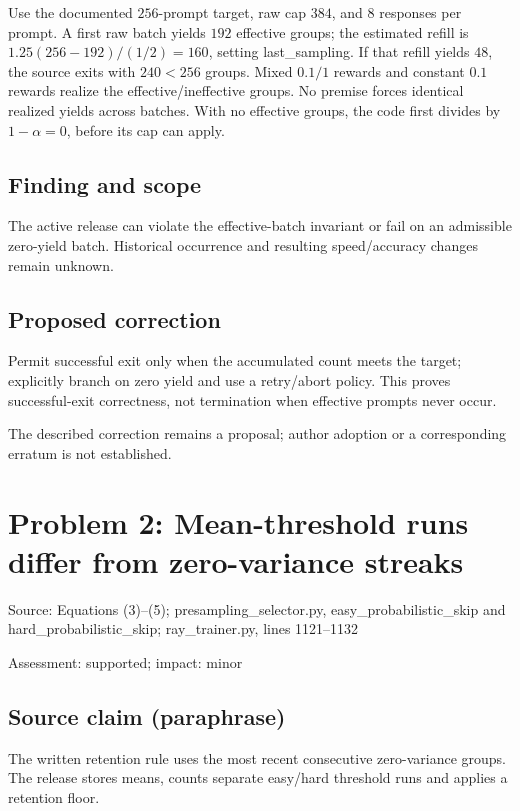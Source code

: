 \documentclass[11pt]{article}
\begin{document}
Use the documented \(256\)-prompt target, raw cap \(384\), and \(8\) responses per prompt. A first raw batch yields \(192\) effective groups; the estimated refill is \(1.25(256-192)/(1/2)=160\), setting last\_sampling. If that refill yields \(48\), the source exits with \(240<256\) groups. Mixed \(0.1/1\) rewards and constant \(0.1\) rewards realize the effective/ineffective groups. No premise forces identical realized yields across batches. With no effective groups, the code first divides by \(1-\alpha=0\), before its cap can apply.

\subsection*{Finding and scope}

The active release can violate the effective-batch invariant or fail on an admissible zero-yield batch. Historical occurrence and resulting speed/accuracy changes remain unknown.

\subsection*{Proposed correction}

Permit successful exit only when the accumulated count meets the target; explicitly branch on zero yield and use a retry/abort policy. This proves successful-exit correctness, not termination when effective prompts never occur.

The described correction remains a proposal; author adoption or a corresponding erratum is not established.

\section*{Problem 2: Mean-threshold runs differ from zero-variance streaks}

Source: Equations (3)–(5); presampling\_selector.py, easy\_probabilistic\_skip and hard\_probabilistic\_skip; ray\_trainer.py, lines 1121–1132

Assessment: supported; impact: minor

\subsection*{Source claim (paraphrase)}

The written retention rule uses the most recent consecutive zero-variance groups. The release stores means, counts separate easy/hard threshold runs and applies a retention floor.
\end{document}
